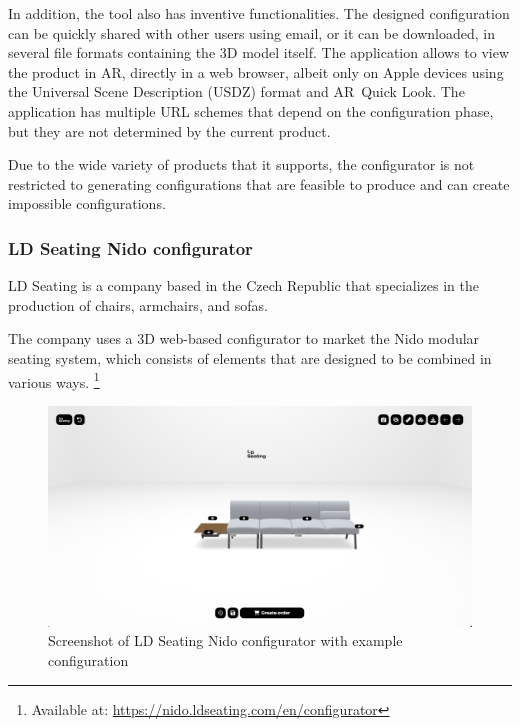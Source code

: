 In addition, the tool also has inventive functionalities. The designed configuration can be quickly shared with other users using email, or it can be downloaded, in several file formats containing the 3D model itself. The application allows to view the product in AR, directly in a web browser, albeit only on Apple devices using the Universal Scene Description (USDZ) format and AR~Quick Look. \cite{Jackson2018}
The application has multiple URL schemes that depend on the configuration phase, but they are not determined by the current product. 

Due to the wide variety of products that it supports, the configurator is not restricted to generating configurations that are feasible to produce and can create impossible configurations.


\subsubsection{LD Seating Nido configurator}

LD Seating is a company based in the Czech Republic that specializes in the production of chairs, armchairs, and sofas. \cite{LDSeating}

The company uses a 3D web-based configurator to market the Nido modular seating system, which consists of elements that are designed to be combined in various ways. \footnote{Available at: \url{https://nido.ldseating.com/en/configurator}}

\begin{figure}[ht]
\centering
\includegraphics[width=\textwidth]{images/analysis_nido-configurator.png}
\caption{Screenshot of LD Seating Nido configurator with example configuration}
\end{figure}

